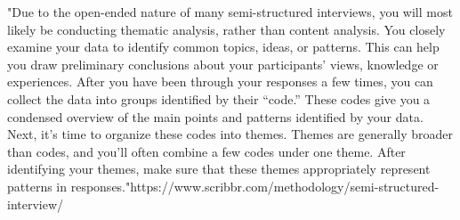 "Due to the open-ended nature of many semi-structured interviews, you will most likely be conducting thematic analysis, rather than content analysis.
You closely examine your data to identify common topics, ideas, or patterns. This can help you draw preliminary conclusions about your participants’ views, knowledge or experiences.
After you have been through your responses a few times, you can collect the data into groups identified by their “code.” These codes give you a condensed overview of the main points and patterns identified by your data.
Next, it’s time to organize these codes into themes. Themes are generally broader than codes, and you’ll often combine a few codes under one theme. After identifying your themes, make sure that these themes appropriately represent patterns in responses."https://www.scribbr.com/methodology/semi-structured-interview/

